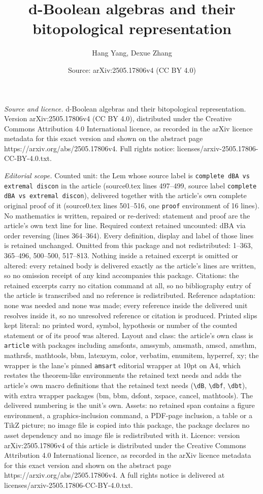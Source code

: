 \documentclass[10pt,a4paper]{amsart}
\title[d-Boolean algebras and their bitopological representation]{d-Boolean algebras and their bitopological representation}
\author{Hang Yang, Dexue Zhang}
\date{Source: arXiv:2505.17806v4 (CC BY 4.0)}
\begin{document}
\maketitle

\noindent\emph{Source and licence.} d-Boolean algebras and their bitopological representation. Version arXiv:2505.17806v4 (CC BY 4.0), distributed under the Creative Commons Attribution 4.0 International licence, as recorded in the arXiv licence metadata for this exact version and shown on the abstract page https://arxiv.org/abs/2505.17806v4. Full rights notice: licenses/arxiv-2505.17806-CC-BY-4.0.txt.\par\smallskip

\noindent\textit{Editorial scope.} Counted unit: the Lem whose source label is \texttt{complete dBA vs extremal discon} in the article (source0.tex lines 497--499, source label \texttt{complete dBA vs extremal discon}), delivered together with the article's own complete original proof of it (source0.tex lines 501--516, one \texttt{proof} environment of 16 lines). No mathematics is written, repaired or re-derived: statement and proof are the article's own text line for line. Required context retained uncounted: dBA via order reversing (lines 364--364). Every definition, display and label of those lines is retained unchanged. Omitted from this package and not redistributed: 1--363, 365--496, 500--500, 517--813. Nothing inside a retained excerpt is omitted or altered: every retained body is delivered exactly as the article's lines are written, so no omission receipt of any kind accompanies this package. Citations: the retained excerpts carry no citation command at all, so no bibliography entry of the article is transcribed and no reference is redistributed. Reference adaptation: none was needed and none was made; every reference inside the delivered unit resolves inside it, so no unresolved reference or citation is produced. Printed slips kept literal: no printed word, symbol, hypothesis or number of the counted statement or of its proof was altered. Layout and class: the article's own class is \texttt{article} with packages including amsfonts, amssymb, amsmath, amscd, amsthm, mathrsfs, mathtools, bbm, latexsym, color, verbatim, enumitem, hyperref, xy; the wrapper is the lane's pinned \texttt{amsart} editorial wrapper at 10pt on A4, which restates the theorem-like environments the retained text needs and adds the article's own macro definitions that the retained text needs (\texttt{\textbackslash dB}, \texttt{\textbackslash dbf}, \texttt{\textbackslash dbt}), with extra wrapper packages (bm, bbm, dsfont, xspace, cancel, mathtools). The delivered numbering is the unit's own. Assets: no retained span contains a figure environment, a graphics-inclusion command, a PDF-page inclusion, a table or a TikZ picture; no image file is copied into this package, the package declares no asset dependency and no image file is redistributed with it. Licence: version arXiv:2505.17806v4 of this article is distributed under the Creative Commons Attribution 4.0 International licence, as recorded in the arXiv licence metadata for this exact version and shown on the abstract page https://arxiv.org/abs/2505.17806v4. A full rights notice is delivered at licenses/arxiv-2505.17806-CC-BY-4.0.txt. 
\end{document}
